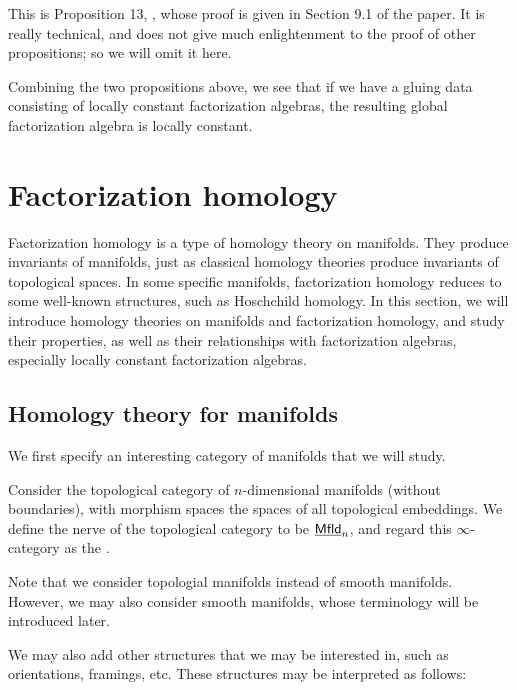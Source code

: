 \documentclass[twoside]{article}
\begin{document}
This is Proposition 13, \cite{Gin13}, whose proof is given in Section 9.1
of the paper. It is really technical, and does not give much enlightenment
to the proof of other propositions; so we will omit it here.

Combining the two propositions above, we see that if we have a gluing data
consisting of locally constant factorization algebras, the resulting global
factorization algebra is locally constant. 

\section{Factorization homology}

Factorization homology is a type of homology theory on
manifolds. They produce invariants of manifolds, just as classical
homology theories produce invariants of topological spaces. In some specific
manifolds, factorization homology reduces to some well-known structures,
such as Hoschchild homology. In this section, we will introduce homology
theories on manifolds and factorization homology, and study their properties,
as well as their relationships with factorization algebras, especially locally
constant factorization algebras.

\subsection{Homology theory for manifolds}

We first specify an interesting category of manifolds that we will study.

\begin{definition}
    Consider the topological category of $n$-dimensional manifolds
    (without boundaries), with morphism spaces the spaces of all topological embeddings.
    We define the nerve of the topological category to be $\underline{\smash{\mathsf{Mfld}}}_n$, and regard
    this $\infty$-category as the .
\end{definition}

Note that we consider topologial manifolds instead of smooth manifolds.
However, we may also consider smooth manifolds, whose terminology will be
introduced later.

We may also add other structures that we may be interested in, such as
orientations, framings, etc. These structures may be interpreted as follows:
\end{document}
